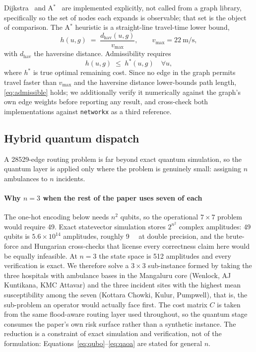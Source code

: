 \documentclass[journal]{IEEEtran}
\begin{document}
Dijkstra~\citep{dijkstra1959} and A$^\ast$~\citep{hart1968} are implemented
explicitly, not called from a graph library, specifically so the set of
nodes each expands is observable; that set is the object of comparison. The
A$^\ast$ heuristic is a straight-line travel-time lower bound,
\begin{equation}
h(u,g) \;=\; \frac{d_{\mathrm{hav}}(u,g)}{v_{\max}},
\qquad v_{\max}=\SI{22}{\metre\per\second},
\label{eq:heuristic}
\end{equation}
with $d_{\mathrm{hav}}$ the haversine distance. Admissibility requires
\begin{equation}
h(u,g) \;\le\; h^{*}(u,g) \quad \forall u,
\label{eq:admissible}
\end{equation}
where $h^{*}$ is true optimal remaining cost. Since no edge in the graph permits
travel faster than $v_{\max}$ and the haversine distance lower-bounds path
length, \eqref{eq:admissible} holds; we additionally verify it numerically
against the graph's own edge weights before reporting any result, and cross-check
both implementations against \texttt{networkx} as a third reference.

\subsection{Hybrid quantum dispatch}
\label{sec:method-qaoa}
A \num{28529}-edge routing problem is far beyond exact quantum simulation, so the
quantum layer is applied only where the problem is genuinely small: assigning
$n$ ambulances to $n$ incidents.

\paragraph{Why $n=3$ when the rest of the paper uses seven of each}
The one-hot encoding below needs $n^2$ qubits, so the operational $7\times7$
problem would require 49. Exact statevector simulation stores $2^{n^2}$ complex
amplitudes: 49 qubits is $5.6\times10^{14}$ amplitudes, roughly \SI{9}{\peta\byte}
at double precision, and the brute-force and Hungarian cross-checks that license
every correctness claim here would be equally infeasible. At $n=3$ the state
space is 512 amplitudes and every verification is exact. We therefore solve a
$3\times3$ sub-instance formed by taking the three hospitals with ambulance
bases in the Mangaluru core (Wenlock, AJ Kuntikana, KMC Attavar) and the three
incident sites with the highest mean susceptibility among the seven (Kottara
Chowki, Kulur, Pumpwell), that is, the sub-problem an operator would actually
face first. The cost matrix $C$ is taken from the same flood-aware routing layer
used throughout, so the quantum stage consumes the paper's own risk surface
rather than a synthetic instance. The reduction is a constraint of exact
simulation and verification, not of the formulation:
Equations~\eqref{eq:qubo}--\eqref{eq:qaoa} are stated for general $n$.
\end{document}
